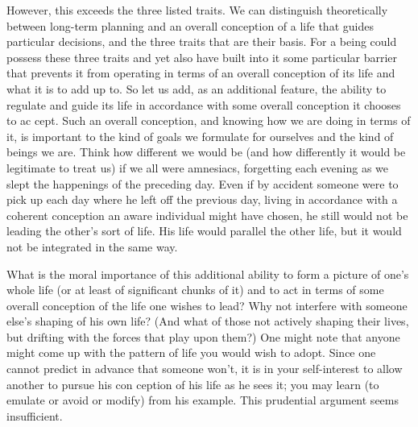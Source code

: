 \documentclass[11pt,openany]{book}
\begin{document}
However, this exceeds the three listed traits. We can distinguish theoretically between long-term planning and an overall conception of a life that guides particular decisions, and the three traits that are their basis. For a being could possess these three traits and yet also have built into it some particular barrier that prevents it from operating in terms of an overall conception of its life and what it is to add up to. So let us add, as an additional feature, the ability to regulate and guide its life in accordance with some overall conception it chooses to ac cept. Such an overall conception, and knowing how we are doing in terms of it, is important to the kind of goals we formulate for ourselves and the kind of beings we are. Think how different we would be (and how differently it would be legitimate to treat us) if we all were amnesiacs, forgetting each evening as we slept the happenings of the preceding day. Even if by accident someone were to pick up each day where he left off the previous day, living in accordance with a coherent conception an aware individual might have chosen, he still would not be leading the other's sort of life. His life would parallel the other life, but it would not be integrated in the same way. 

What is the moral importance of this additional ability to form a picture of one's whole life (or at least of significant chunks of it) and to act in terms of some overall conception of the life one wishes to lead? Why not interfere with someone else's shaping of his own life? (And what of those not actively shaping their lives, but drifting with the forces that play upon them?) One might note that anyone might come up with the pattern of life you would wish to adopt. Since one cannot predict in advance that someone won't, it is in your self-interest to allow another to pursue his con ception of his life as he sees it; you may learn (to emulate or avoid or modify) from his example. This prudential argument seems insufficient. 
\end{document}
